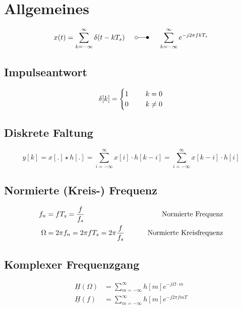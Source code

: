 \section{Allgemeines}

\begin{equation*}
    x(t) = \sum_{k=-\infty}^{\infty} \delta(t - kT_s) \knochen \sum_{k=-\infty}^{\infty} e^{-j2\pi fkT_s}
\end{equation*}

\subsection{Impulseantwort}

\begin{equation*}
    \delta[k] = \begin{cases}
        1 & \hspace{5mm} k=0 \\
        0 & \hspace{5mm} k \neq 0 \\
    \end{cases}
\end{equation*}

\subsection{Diskrete Faltung}

\begin{equation*}
    y[k] = x[.] \star h[.] = \sum_{i=-\infty}^{\infty} x[i]\cdot h[k-i] = \sum_{i=-\infty}^{\infty} x[k-i] \cdot h[i]
\end{equation*}

\subsection{Normierte (Kreis-) Frequenz}

\begin{align*}
    f_n    &= f T_s = \frac{f}{f_s}                     &\hspace{8mm}\textrm{Normierte Frequenz} \\
    \Omega &= 2\pi f_n = 2\pi f T_s = 2\pi\frac{f}{f_s} &\hspace{8mm}\textrm{Normierte Kreisfrequenz} \\
\end{align*}

\subsection{Komplexer Frequenzgang}
\begin{align*}
    \underline{H}(\Omega) &= \sum_{m=-\infty}^{\infty} h[m] e^{-j\Omega \cdot m} \\
    \underline{H}(f)      &= \sum_{m=-\infty}^{\infty} h[m] e^{-j2\pi f m T}
\end{align*}


